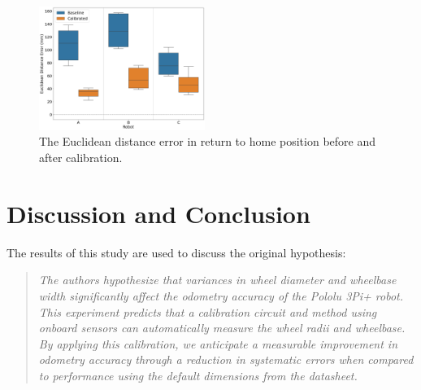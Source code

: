 \documentclass[conference]{IEEEtran}
\begin{document}
\begin{figure}[tbh!]
    \centering
    \includegraphics[width = 0.48\textwidth]{img/xy_error_boxplot.png}
    \caption{The Euclidean distance error in return to home position before and after calibration.}
    \label{fig:xy_box}
\end{figure}




\section{Discussion and Conclusion}\label{sec:discussion_conclusion}

The results of this study are used to discuss the original hypothesis:


\begin{quote}
    \emph{
    The authors hypothesize that variances in wheel diameter and wheelbase width significantly affect the odometry accuracy of the Pololu 3Pi+ robot.
    This experiment predicts that a calibration circuit and method using onboard sensors can automatically measure the wheel radii and wheelbase.
    By applying this calibration, we anticipate a measurable improvement in odometry accuracy through a reduction in systematic errors when compared to performance using the default dimensions from the datasheet.}
\end{quote}
\end{document}
